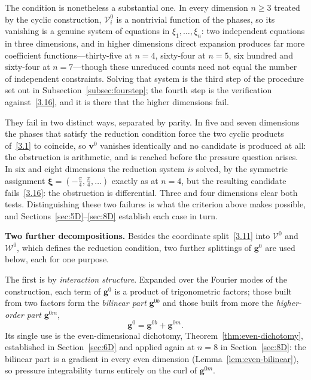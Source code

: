 \documentclass[11pt]{jfm}
\let\ge=\geqslant  \let\geq=\geqslant
\numberwithin{equation}{section}
\begin{document}
The condition is nonetheless a substantial one. In every dimension $n\ge3$ treated by the cyclic
construction, $\mathcal V_i^0$ is a nontrivial function of the phases, so its vanishing is a genuine system of
equations in $\xi_1,\dots,\xi_n$: two independent equations in three dimensions, and in higher
dimensions direct expansion produces far more coefficient functions---thirty-five at $n=4$,
sixty-four at $n=5$, six hundred and sixty-four at $n=7$---though these unreduced counts need not
equal the number of independent constraints. Solving that system is the third step of the
procedure set out in Subsection~\ref{subsec:fourstep}; the fourth step is the verification
against~\eqref{3.16}, and it is there that the higher dimensions fail.

They fail in two distinct ways, separated by parity. In five and seven dimensions the phases that
satisfy the reduction condition force the two cyclic products of~\eqref{3.1} to coincide, so
$\boldsymbol{v}^0$ vanishes identically and no candidate is produced at all: the obstruction is
arithmetic, and is reached before the pressure question arises. In six and eight dimensions the
reduction system \emph{is} solved, by the symmetric assignment
$\boldsymbol{\xi}=(-\tfrac{\pi}{4},\tfrac{\pi}{4},\dots)$ exactly as at $n=4$, but the resulting
candidate fails~\eqref{3.16}: the obstruction is differential. Three and four dimensions clear both
tests. Distinguishing these two failures is what the criterion above makes possible, and
Sections~\ref{sec:5D}--\ref{sec:8D} establish each case in turn.

\medskip
\noindent\textbf{Two further decompositions.} Besides the coordinate split~\eqref{3.11} into
$\mathcal{V}^0$ and $\mathcal{W}^0$, which defines the reduction condition, two further splittings
of $\boldsymbol{g}^0$ are used below, each for one purpose.

The first is by \emph{interaction structure}. Expanded over the Fourier modes of the construction,
each term of $\boldsymbol{g}^0$ is a product of trigonometric factors; those built from two
factors form the \emph{bilinear part} $\boldsymbol{g}^{0b}$ and those built from more the
\emph{higher-order part} $\boldsymbol{g}^{0m}$,
\begin{equation}
\label{3.17}
\boldsymbol{g}^0 = \boldsymbol{g}^{0b} + \boldsymbol{g}^{0m} .
\end{equation}
Its single use is the even-dimensional dichotomy, Theorem~\ref{thm:even-dichotomy}, established in
Section~\ref{sec:6D} and applied again at $n=8$ in Section~\ref{sec:8D}: the bilinear part is a
gradient in every even dimension (Lemma~\ref{lem:even-bilinear}), so pressure integrability turns
entirely on the curl of $\boldsymbol{g}^{0m}$.
\end{document}
